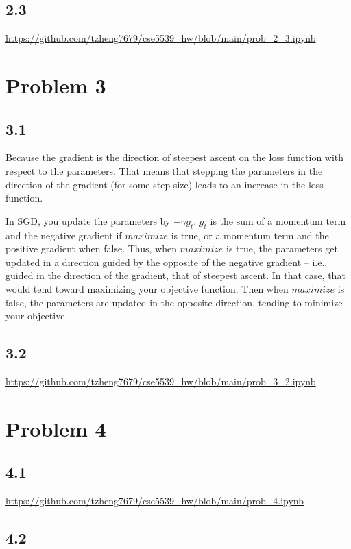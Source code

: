 \documentclass{article}
\begin{document}
\subsection*{2.3}

\url{https://github.com/tzheng7679/cse5539_hw/blob/main/prob_2_3.ipynb}

\section*{Problem 3}

\subsection*{3.1}

Because the gradient is the direction of steepest ascent on the loss function with respect to the parameters. That means that stepping the parameters in the direction of the gradient (for some step size) leads to an increase in the loss function.

In SGD, you update the parameters by $-\gamma g_t$. $g_t$ is the sum of a momentum term and the negative gradient if $maximize$ is true, or a momentum term and the positive gradient when false. Thus, when $maximize$ is true, the parameters get updated in a direction guided by the opposite of the negative gradient -- i.e., guided in the direction of the gradient, that of steepest ascent. In that case, that would tend toward maximizing your objective function. Then when $maximize$ is false, the parameters are updated in the opposite direction, tending to minimize your objective.

\subsection*{3.2}

\url{https://github.com/tzheng7679/cse5539_hw/blob/main/prob_3_2.ipynb}

\section*{Problem 4}

\subsection*{4.1}

\url{https://github.com/tzheng7679/cse5539_hw/blob/main/prob_4.ipynb}

\subsection*{4.2}
\end{document}
